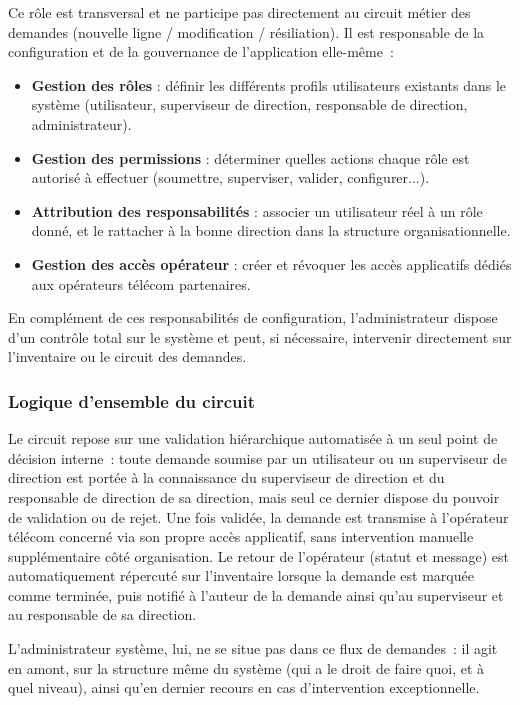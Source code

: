 \documentclass[11pt,a4paper]{article}
\begin{document}
Ce rôle est transversal et ne participe pas directement au circuit métier des demandes (nouvelle ligne / modification / résiliation). Il est responsable de la configuration et de la gouvernance de l'application elle-même~:

\begin{itemize}
    \item \textbf{Gestion des rôles} : définir les différents profils utilisateurs existants dans le système (utilisateur, superviseur de direction, responsable de direction, administrateur).
    \item \textbf{Gestion des permissions} : déterminer quelles actions chaque rôle est autorisé à effectuer (soumettre, superviser, valider, configurer...).
    \item \textbf{Attribution des responsabilités} : associer un utilisateur réel à un rôle donné, et le rattacher à la bonne direction dans la structure organisationnelle.
    \item \textbf{Gestion des accès opérateur} : créer et révoquer les accès applicatifs dédiés aux opérateurs télécom partenaires.
\end{itemize}

En complément de ces responsabilités de configuration, l'administrateur dispose d'un contrôle total sur le système et peut, si nécessaire, intervenir directement sur l'inventaire ou le circuit des demandes.

\subsubsection{Logique d'ensemble du circuit}

Le circuit repose sur une validation hiérarchique automatisée à un seul point de décision interne~: toute demande soumise par un utilisateur ou un superviseur de direction est portée à la connaissance du superviseur de direction et du responsable de direction de sa direction, mais seul ce dernier dispose du pouvoir de validation ou de rejet. Une fois validée, la demande est transmise à l'opérateur télécom concerné via son propre accès applicatif, sans intervention manuelle supplémentaire côté organisation. Le retour de l'opérateur (statut et message) est automatiquement répercuté sur l'inventaire lorsque la demande est marquée comme terminée, puis notifié à l'auteur de la demande ainsi qu'au superviseur et au responsable de sa direction.

L'administrateur système, lui, ne se situe pas dans ce flux de demandes~: il agit en amont, sur la structure même du système (qui a le droit de faire quoi, et à quel niveau), ainsi qu'en dernier recours en cas d'intervention exceptionnelle.
\end{document}
